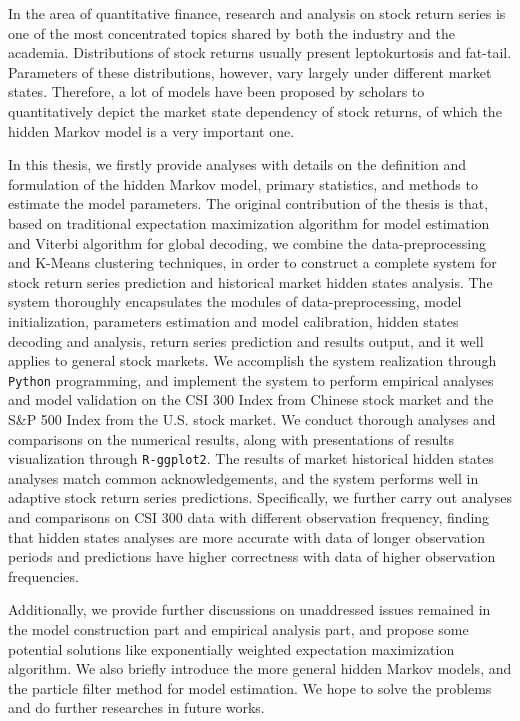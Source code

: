 \setlength\parindent{0pt}
\begin{englishabstract}
In the area of quantitative finance,
research and analysis on stock return series is one of the most concentrated topics 
shared by both the industry and the academia.
Distributions of stock returns usually present leptokurtosis and fat-tail.
Parameters of these distributions, however, vary largely under different market states.
Therefore, a lot of models have been proposed by scholars to 
quantitatively depict the market state dependency of stock returns,
of which the hidden Markov model is a very important one.

In this thesis, we firstly provide analyses with details on 
the definition and formulation of the hidden Markov model,
primary statistics, and methods to estimate the model parameters.
The original contribution of the thesis is that,
based on traditional expectation maximization algorithm for model estimation and 
Viterbi algorithm for global decoding,
we combine the data-preprocessing and K-Means clustering techniques,
in order to construct a complete system for stock return series prediction and 
historical market hidden states analysis.
The system thoroughly encapsulates the modules of data-preprocessing, 
model initialization, parameters estimation and model calibration, 
hidden states decoding and analysis, return series prediction and results output,
and it well applies to general stock markets.
We accomplish the system realization through \texttt{Python} programming,
and implement the system to perform empirical analyses and model validation 
on the CSI 300 Index from Chinese stock market and the S\&P 500 Index from the U.S. stock market.
We conduct thorough analyses and comparisons on the numerical results,
along with presentations of results visualization through \texttt{R-ggplot2}.
The results of market historical hidden states analyses match common acknowledgements,
and the system performs well in adaptive stock return series predictions.
Specifically, we further carry out analyses and comparisons on 
CSI 300 data with different observation frequency,
finding that hidden states analyses are more accurate with data of longer observation periods
and predictions have higher correctness with data of higher observation frequencies.

Additionally, we provide further discussions on unaddressed issues remained 
in the model construction part and empirical analysis part,
and propose some potential solutions like exponentially weighted expectation maximization algorithm.
We also briefly introduce the more general hidden Markov models,
and the particle filter method for model estimation.
We hope to solve the problems and do further researches in future works.

\end{englishabstract}
